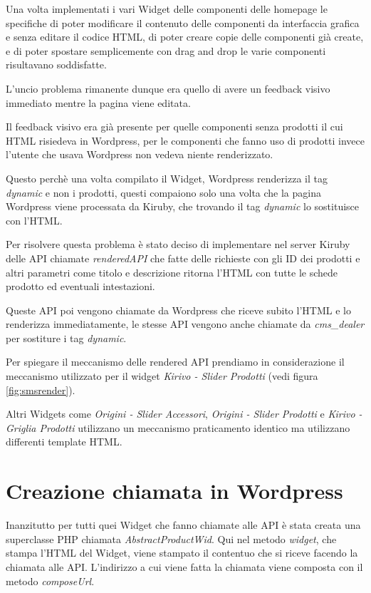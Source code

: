 


Una volta implementati i vari Widget delle componenti delle homepage le specifiche di poter
modificare il contenuto delle componenti da interfaccia grafica e senza editare
il codice HTML, di poter creare copie delle componenti già create, e di poter spostare
semplicemente con drag and drop le varie componenti risultavano soddisfatte.

L'uncio problema rimanente dunque era quello di avere un feedback visivo immediato mentre
la pagina viene editata.

Il feedback visivo era già presente per quelle componenti senza prodotti il cui HTML risiedeva in Wordpress,
per le componenti che fanno uso di prodotti invece l'utente che usava Wordpress non vedeva niente renderizzato.

Questo perchè una volta compilato il Widget, Wordpress renderizza il tag \emph{dynamic} e non i prodotti,
questi compaiono solo una volta che la pagina Wordpress viene processata da Kiruby, che trovando il tag \emph{dynamic}
lo sostituisce con l'HTML.

Per risolvere questa problema è stato deciso di implementare nel server Kiruby delle API chiamate
\emph{renderedAPI} che fatte delle richieste con gli ID dei prodotti e altri parametri come titolo e descrizione
ritorna l'HTML con tutte le schede prodotto ed eventuali intestazioni.

Queste API poi vengono chiamate da Wordpress che riceve subito l'HTML e lo renderizza immediatamente,
le stesse API vengono anche chiamate da \emph{cms\_dealer} per sostiture i tag \emph{dynamic}.

Per spiegare il meccanismo delle rendered API prendiamo in considerazione il meccanismo utilizzato per il widget
\emph{Kirivo - Slider Prodotti} (vedi figura \ref{fig:smsrender}).

Altri Widgets come \emph{Origini - Slider Accessori}, \emph{Origini - Slider Prodotti} e \emph{Kirivo - Griglia Prodotti}
utilizzano un meccanismo praticamento identico ma utilizzano differenti template HTML.

\section{Creazione chiamata in Wordpress}
Inanzitutto per tutti quei Widget che fanno chiamate alle API è stata creata una superclasse PHP chiamata
\emph{AbstractProductWid}.
Qui nel metodo \emph{widget}, che stampa l'HTML del Widget, viene stampato il contentuo che si riceve facendo la chiamata alle
API. L'indirizzo a cui viene fatta la chiamata viene composta con il metodo \emph{composeUrl}.

